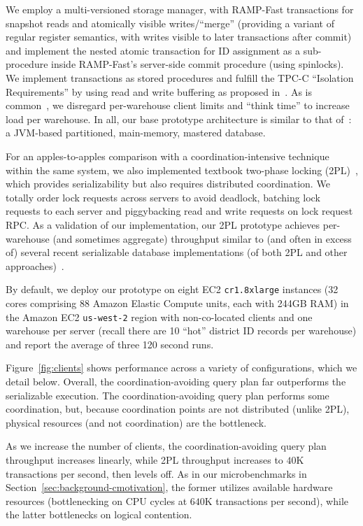  We employ a multi-versioned
storage manager, with RAMP-Fast transactions for snapshot reads and
atomically visible writes/``merge'' (providing a variant of regular
register semantics, with writes visible to later transactions after
commit)~\cite{ramp-sigmod14} and implement the nested atomic transaction
for ID assignment as a sub-procedure inside RAMP-Fast's server-side
commit procedure (using spinlocks). We implement transactions as
stored procedures and fulfill the TPC-C ``Isolation Requirements'' by
using read and write buffering as proposed in~\cite{hat-vldb}. As is
common~\cite{calvin,abadi-vll,hstore,jones-dtxn}, we disregard
per-warehouse client limits and ``think time'' to increase load per
warehouse. In all, our base prototype architecture is similar to that
of~\cite{ramp-sigmod14}: a JVM-based partitioned, main-memory, mastered
database.

For an apples-to-apples comparison with a coordination-intensive
technique within the same system, we also implemented textbook
two-phase locking (2PL)~\cite{bernstein-book}, which provides
serializability but also requires distributed coordination. We totally
order lock requests across servers to avoid deadlock, batching lock
requests to each server and piggybacking read and write requests on
lock request RPC. As a validation of our implementation, our 2PL
prototype achieves per-warehouse (and sometimes aggregate) throughput
similar to (and often in excess of) several recent serializable
database implementations (of both 2PL and other
approaches)~\cite{calvin,abadi-vll,hstore,jones-dtxn}.

By default, we deploy our prototype on eight EC2 \texttt{cr1.8xlarge}
instances (32 cores comprising 88 Amazon Elastic Compute units, each
with 244GB RAM) in the Amazon EC2 \texttt{us-west-2} region with
non-co-located clients and one warehouse per server (recall there
are 10 ``hot'' district ID records per warehouse) and report the
average of three 120 second runs.

 Figure~\ref{fig:clients} shows performance
across a variety of configurations, which we detail below. Overall,
the coordination-avoiding query plan far outperforms the serializable
execution. The coordination-avoiding query plan performs some
coordination, but, because coordination points are not distributed
(unlike 2PL), physical resources (and not coordination) are the bottleneck.

 As we increase the number of clients, the
coordination-avoiding query plan throughput increases linearly, while
2PL throughput increases to $40$K transactions per second, then levels
off. As in our microbenchmarks in
Section~\ref{sec:background-cmotivation}, the former utilizes
available hardware resources (bottlenecking on CPU cycles at $640$K
transactions per second), while the latter bottlenecks on logical
contention.

